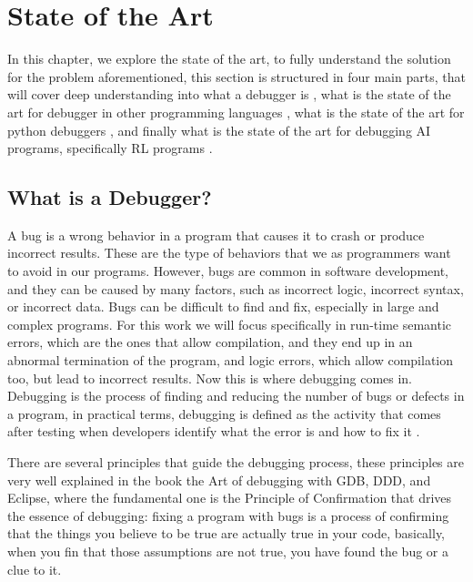 
\chapter{State of the Art}
\label{cha:state_of_the_art}

In this chapter, we explore the state of the art, to fully understand the solution 
for the problem aforementioned, this section is structured in four main parts, that 
will cover deep understanding into what a debugger is , what is the 
state of the art for debugger in other programming languages , what 
is the state of the art for python debuggers , and finally what is the 
state of the art for debugging \ac{AI} programs, specifically \ac{RL} programs .

\section{What is a Debugger?}
\label{sec:deb}
A bug is a wrong behavior in a program that causes it to crash or produce incorrect 
results. These are the type of behaviors that we as programmers want to avoid in our
programs. However, bugs are common in software development, and they can be caused by 
many factors, such as incorrect logic, incorrect syntax, or incorrect data. Bugs can
be difficult to find and fix, especially in large and complex programs. For this work 
we will focus specifically in run-time semantic errors, which are the ones that allow 
compilation, and they end up in an abnormal termination of the program, and logic 
errors, which allow compilation too, but lead to incorrect results. Now this is where 
debugging comes in. Debugging is the process of finding and reducing the number of 
bugs or defects in a program\cite{10.1007/978-3-642-32729-2_3}, in practical terms, 
debugging is defined as the activity that comes after testing when developers identify 
what the error is and how to fix it \cite{10.1080/08993400802114581}. 

There are several principles that guide the debugging process, these principles are 
very well explained in the book the Art of debugging with \ac{GDB}, \ac{DDD}, and Eclipse\cite{10.5555/1457534},
where the fundamental one is the Principle of Confirmation that drives the essence of 
debugging: fixing a program with bugs is a process of confirming that the things you believe
to be true are actually true in your code\cite{10.5555/1457534}, basically, 
when you fin that those assumptions are not true, you have found the bug or a clue to it.

